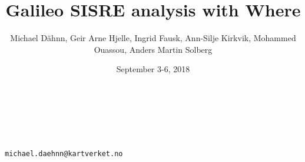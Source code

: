 \documentclass{beamer}
\title{Galileo SISRE analysis with Where}
\author{Michael D\"ahnn, Geir Arne Hjelle, Ingrid Fausk, Ann-Silje Kirkvik, Mohammed Ouassou, Anders Martin Solberg}
\institute{Norwegian Mapping Authority, Geodetic Institute}
\date{September 3-6, 2018}
\makeatletter
\newcommand{\contact}{michael.daehnn@kartverket.no}
\makeatother
\begin{document}
\begin{frame}[t]
  \color{white} 
  \vspace*{2cm}
  \begin{columns}
    \begin{column}[t]{.97\textwidth}
      {\bfseries\fontsize{88}{120}\selectfont \inserttitle}
    \end{column}
  \end{columns}

  \vspace*{2cm}
  \begin{columns}
    \begin{column}[t]{.25\textwidth}
      {\fontsize{30}{36}\selectfont\insertauthor\\[0.5cm]
        \fontsize{30}{36}\selectfont{\itshape\insertinstitute}\\
        \fontsize{24}{18}\selectfont\texttt{\contact}}
    \end{column}

    \begin{column}[t]{.7\textwidth}
      {\fontsize{30}{36}\selectfont\setlength{\parskip}{15pt}}
    \end{column}  
  \end{columns}



  \vspace*{1.5cm}
  \begin{columns}
    \begin{column}[t]{.68\textwidth}
      \begin{block}{}%
        \begin{multicols}{2}

          {\fontsize{21}{36}\setlength{\parskip}{16pt}}
        \end{multicols}
      \end{block}



\end{column}
\end{columns}
\end{frame}
\end{document}
